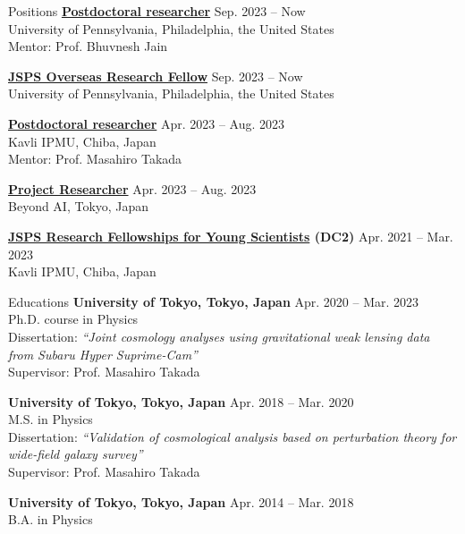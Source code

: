 \documentclass{sty/resume} %
\begin{document}
\begin{rSection}{Positions}
{\bf \href{https://www.physics.upenn.edu/people/sunao-sugiyama}{Postdoctoral researcher}} \hfill {Sep. 2023 -- Now}\\
University of Pennsylvania, Philadelphia, the United States\\
Mentor: Prof. Bhuvnesh Jain

{\bf \href{https://www.jsps.go.jp/english/e-ab/index.html}{JSPS Overseas Research Fellow}} \hfill {Sep. 2023 -- Now}\\
University of Pennsylvania, Philadelphia, the United States

{\bf \href{https://db.ipmu.jp/member/personal/5761en.html}{Postdoctoral researcher}} \hfill {Apr. 2023 -- Aug. 2023}\\
Kavli IPMU, Chiba, Japan\\
Mentor: Prof. Masahiro Takada

{\bf \href{https://beyondai.jp/contents/projects/murayama/?lang=en}{Project Researcher}} \hfill {Apr. 2023 -- Aug. 2023}\\
Beyond AI, Tokyo, Japan

{\bf \href{https://www.jsps.go.jp/english/e-pd/}{JSPS Research Fellowships for Young Scientists} (DC2)} \hfill {Apr. 2021 -- Mar. 2023}\\
Kavli IPMU, Chiba, Japan
\end{rSection}


\begin{rSection}{Educations}
{\bf University of Tokyo, Tokyo, Japan}  \hfill {Apr. 2020 -- Mar. 2023}\\
Ph.D. course in Physics\\
Dissertation: \textit{``Joint cosmology analyses using gravitational weak lensing data from Subaru Hyper Suprime-Cam''}\\
Supervisor: Prof. Masahiro Takada

{\bf University of Tokyo, Tokyo, Japan}  \hfill {Apr. 2018 -- Mar. 2020}\\
M.S. in Physics\\
Dissertation: \textit{``Validation of cosmological analysis based on perturbation theory for wide-field galaxy survey''} \\
Supervisor: Prof. Masahiro Takada

{\bf University of Tokyo, Tokyo, Japan}  \hfill {Apr. 2014 -- Mar. 2018}\\
B.A. in Physics
\end{rSection}
\end{document}
